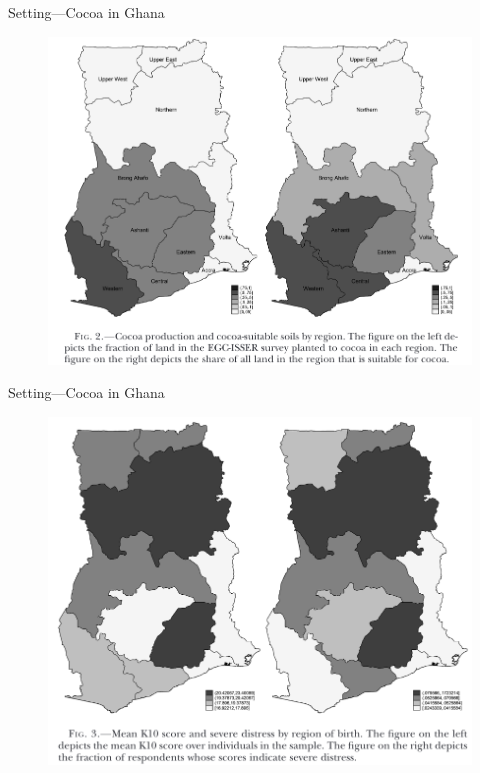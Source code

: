 \documentclass[dvipsnames]{beamer}
\begin{document}
%
\begin{frame}{Setting---Cocoa in Ghana}
    \begin{figure}[htp]
      \centering
      \includegraphics[width=\textwidth, keepaspectratio=true]{fig2.png}
    \end{figure}
\end{frame}
%
\begin{frame}{Setting---Cocoa in Ghana}
    \begin{figure}[htp]
      \centering
      \includegraphics[width=\textwidth, keepaspectratio=true]{fig3.png}
    \end{figure}
    \end{frame}
\end{document}
